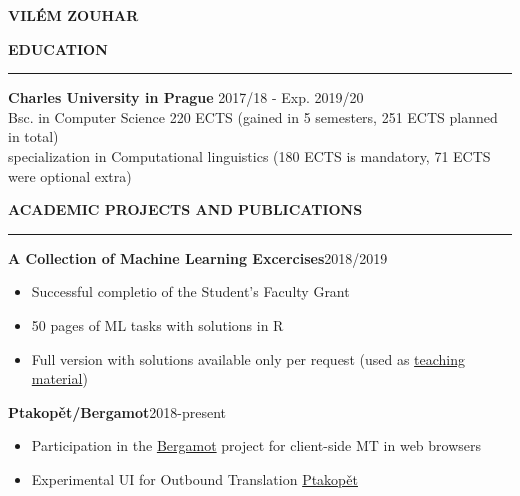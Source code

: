 \documentclass[11pt,a4paper]{article} %
\newcommand{\hSection}[1]{
    \medskip
    \MakeUppercase{\bf #1}
    \medskip
    \hrule
}
\newcommand{\hSubsectionI}[2]{{\bf #1}\hfill {#2}\hspace{-1cm}}
\begin{document}
\begin{center}
    {\LARGE \bf VILÉM ZOUHAR} \\
    {\large \href{mailto:vilem.zouhar@mff.cuni.cz}{\color{black}{vilem.zouhar@mff.cuni.cz}}}
\end{center}

\vspace{0.1cm}

\hSection{Education}\vspace{0.2cm}
{\bf Charles University in Prague} \hfill {2017/18 - Exp. 2019/20} \\
Bsc. in Computer Science \hfill 220 ECTS {\footnotesize (gained in 5 semesters, 251 ECTS planned in total)} \\
specialization in Computational linguistics \hfill {\footnotesize (180 ECTS is mandatory, 71 ECTS were optional extra)} \hspace{-1.2cm}

\hSection{Academic Projects and Publications}

\hSubsectionI{A Collection of Machine Learning Excercises}{2018/2019}

\begin{itemize}
    \item Successful completio of the Student's Faculty Grant
    \item 50 pages of ML tasks with solutions in R
    \item Full version with solutions available only per request (used as \href{http://ufal.mff.cuni.cz/courses/npfl054}{teaching material})
\end{itemize}

\hSubsectionI{Ptakopět/Bergamot}{2018-present}

\begin{itemize}
    \item Participation in the \href{http://browser.mt/}{Bergamot} project for client-side MT in web browsers
    \item Experimental UI for Outbound Translation \href{https://github.com/zouharvi/ptakopet}{Ptakopět}
\end{itemize}
\end{document}
